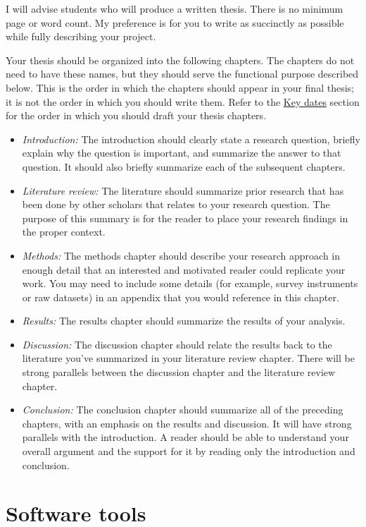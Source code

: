 \documentclass[]{tufte-book}
\begin{document}
I will advise students who will produce a written thesis. There is no minimum page or word count. My preference is for you to write as succinctly as possible while fully describing your project.

Your thesis should be organized into the following chapters. The chapters do not need to have these names, but they should serve the functional purpose described below. This is the order in which the chapters should appear in your final thesis; it is not the order in which you should write them. Refer to the \protect\hyperlink{key-dates}{Key dates} section for the order in which you should draft your thesis chapters.

\begin{itemize}
\item
  \emph{Introduction:} The introduction should clearly state a research question, briefly explain why the question is important, and summarize the answer to that question. It should also briefly summarize each of the subsequent chapters.
\item
  \emph{Literature review:} The literature should summarize prior research that has been done by other scholars that relates to your research question. The purpose of this summary is for the reader to place your research findings in the proper context.
\item
  \emph{Methods:} The methods chapter should describe your research approach in enough detail that an interested and motivated reader could replicate your work. You may need to include some details (for example, survey instruments or raw datasets) in an appendix that you would reference in this chapter.
\item
  \emph{Results:} The results chapter should summarize the results of your analysis.
\item
  \emph{Discussion:} The discussion chapter should relate the results back to the literature you've summarized in your literature review chapter. There will be strong parallels between the discussion chapter and the literature review chapter.
\item
  \emph{Conclusion:} The conclusion chapter should summarize all of the preceding chapters, with an emphasis on the results and discussion. It will have strong parallels with the introduction. A reader should be able to understand your overall argument and the support for it by reading only the introduction and conclusion.
\end{itemize}

\hypertarget{software-tools}{%
\chapter{Software tools}\label{software-tools}}
\end{document}
